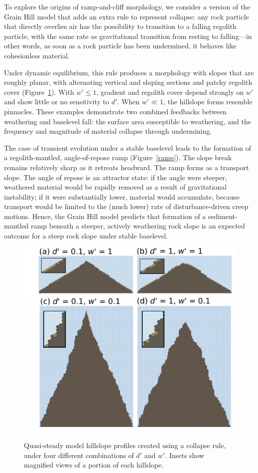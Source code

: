 \documentclass[esurf, manuscript]{copernicus}
\begin{document}
To explore the origins of ramp-and-cliff morphology, we consider a version of the Grain Hill model that adds an extra rule to represent collapse: any rock particle that directly overlies air has the possibility to transition to a falling regolith particle, with the same rate as gravitational transition from resting to falling---in other words, as soon as a rock particle has been undermined, it behaves like cohesionless material.

Under dynamic equilibrium, this rule produces a morphology with slopes that are roughly planar, with alternating vertical and sloping sections and patchy regolith cover (Figure~\ref{collapserule}). With $w'\le 1$, gradient and regolith cover depend strongly on $w'$ and show little or no sensitivity to $d'$. When $w' \ll 1$, the hillslope forms resemble pinnacles. These examples demonstrate two combined feedbacks between weathering and baselevel fall: the surface area susceptible to weathering, and the frequency and magnitude of material collapse through undermining.

The case of transient evolution under a stable baselevel leads to the formation of a regolith-mantled, angle-of-repose ramp (Figure~\ref{ramp}). The slope break remains relatively sharp as it retreats headward. The ramp forms as a transport slope. The angle of repose is an attractor state: if the angle were steeper, weathered material would be rapidly removed as a result of gravitational instability; if it were substantially lower, material would accumulate, because transport would be limited to the (much lower) rate of disturbance-driven creep motions. Hence, the Grain Hill model predicts that formation of a sediment-mantled ramp beneath a steeper, actively weathering rock slope is an expected outcome for a steep rock slope under stable baselevel.


\begin{figure}[t]
\includegraphics[width=12cm]{Figures/collapse_rule.pdf}
\caption{Quasi-steady model hillslope profiles created using a collapse rule, under four different combinations of $d'$ and $w'$. Insets show magnified views of a portion of each hillslope.}
\label{collapserule}
\end{figure}
\end{document}

